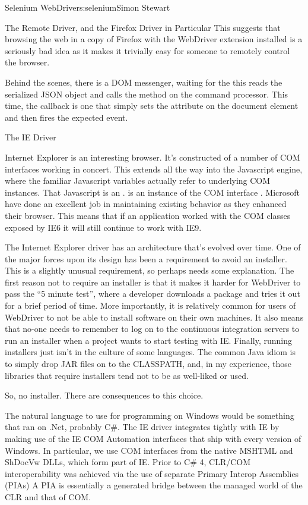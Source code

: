 \begin{aosachapter}{Selenium WebDriver}{s:selenium}{Simon Stewart}
\begin{aosasect1}{The Remote Driver, and the Firefox Driver in Particular}
This suggests that browsing the web in a copy of Firefox with the
WebDriver extension installed is a seriously bad idea as it makes it
trivially easy for someone to remotely control the browser.

Behind the scenes, there is a DOM messenger, waiting for the
 this reads the serialized JSON object and calls
the  method on the command processor. This time, the
callback is one that simply sets the  attribute on the
document element and then fires the expected 
event.

\end{aosasect1}

\begin{aosasect1}{The IE Driver}

Internet Explorer is an interesting browser. It's constructed of a
number of COM interfaces working in concert. This extends all the way
into the Javascript engine, where the familiar Javascript variables
actually refer to underlying COM instances. That Javascript
 is an .   is an
instance of the COM interface . Microsoft have
done an excellent job in maintaining existing behavior as they
enhanced their browser. This means that if an application worked with
the COM classes exposed by IE6 it will still continue to work with
IE9.

The Internet Explorer driver has an architecture that's evolved over
time. One of the major forces upon its design has been a requirement
to avoid an installer. This is a slightly unusual requirement, so
perhaps needs some explanation. The first reason not to require an
installer is that it makes it harder for WebDriver to pass the ``5
minute test'', where a developer downloads a package and tries it out
for a brief period of time. More importantly, it is relatively common
for users of WebDriver to not be able to install software on their own
machines. It also means that no-one needs to remember to log on to the
continuous integration servers to run an installer when a project
wants to start testing with IE\@. Finally, running installers just isn't
in the culture of some languages. The common Java idiom is to simply
drop JAR files on to the CLASSPATH, and, in my experience, those
libraries that require installers tend not to be as well-liked or
used.

So, no installer. There are consequences to this choice.

The natural language to use for programming on Windows would be
something that ran on .Net, probably C\#. The IE driver integrates
tightly with IE by making use of the IE COM Automation interfaces that
ship with every version of Windows. In particular, we use COM
interfaces from the native MSHTML and ShDocVw DLLs, which form part of
IE\@. Prior to C\# 4, CLR/COM interoperability was achieved via the use of
separate Primary Interop Assemblies (PIAs) A PIA is essentially a
generated bridge between the managed world of the CLR and that of COM.


\end{aosasect1}
\end{aosachapter}
